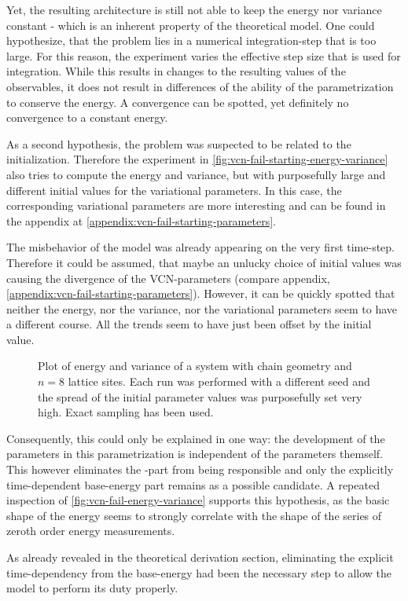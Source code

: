 Yet, the resulting architecture is still not able to keep the energy nor variance constant - which is an inherent property of the theoretical model.
One could hypothesize, that the problem lies in a numerical integration-step that is too large.
For this reason, the experiment varies the effective step size that is used for integration.
While this results in changes to the resulting values of the observables, it does not result in differences of the ability of the parametrization to conserve the energy.
A convergence can be spotted, yet definitely no convergence to a constant energy.

As a second hypothesis, the problem was suspected to be related to the initialization. 
Therefore the experiment in \autoref{fig:vcn-fail-starting-energy-variance} also tries to compute the energy and variance, but with purposefully large and different initial values for the variational parameters.
In this case, the corresponding variational parameters are more interesting and can be found in the appendix at \ref{appendix:vcn-fail-starting-parameters}.

The misbehavior of the model was already appearing on the very first time-step.
Therefore it could be assumed, that maybe an unlucky choice of initial values was causing the divergence of the VCN-parameters (compare appendix, \ref{appendix:vcn-fail-starting-parameters}).
However, it can be quickly spotted that neither the energy, nor the variance, nor the variational parameters seem to have a different course.
All the trends seem to have just been offset by the initial value.

\begin{figure}[htbp]
    \centering
    \vspace{-0.2cm}
    \caption{
            Plot of energy and variance of a system with chain geometry and $n=8$ lattice sites.
            Each run was performed with a different seed and the spread of the initial parameter values was purposefully set very high.
            Exact sampling has been used.
        }
    \label{fig:vcn-fail-starting-energy-variance}
\end{figure}

Consequently, this could only be explained in one way: the development of the parameters in this parametrization is independent of the parameters themself.
This however eliminates the \HNOft[N]-part from being responsible and only the explicitly time-dependent base-energy part remains as a possible candidate.
A repeated inspection of \autoref{fig:vcn-fail-energy-variance} supports this hypothesis, as the basic shape of the energy seems to strongly correlate with the shape of the series of zeroth order energy measurements.

As already revealed in the theoretical derivation section, eliminating the explicit time-dependency from the base-energy had been the necessary step to allow the model to perform its duty properly.